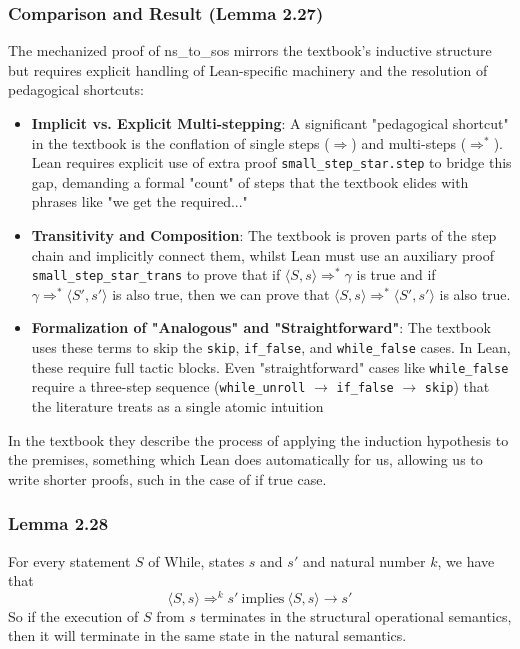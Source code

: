 \subsubsection*{Comparison and Result (Lemma 2.27)}
The mechanized proof of ns\_to\_sos mirrors the textbook's inductive structure
but requires explicit handling of Lean-specific machinery and the resolution
of pedagogical shortcuts:

\begin{itemize}
    \item \textbf{Implicit vs. Explicit Multi-stepping}:
    A significant "pedagogical shortcut" in the textbook is the conflation of
    single steps ($\Rightarrow$) and multi-steps ($\Rightarrow^*$).
    Lean requires explicit use of extra proof \texttt{small\_step\_star.step} to bridge this gap,
    demanding a formal "count" of steps that the textbook elides with phrases
    like "we get the required..."
    
    \item \textbf{Transitivity and Composition}:
    The textbook is proven parts of the step chain and implicitly connect them,
    whilst Lean must use an auxiliary proof\\
    \texttt{small\_step\_star\_trans} to prove that if
    \(\langle S, s \rangle \Rightarrow^* \gamma\) is true and if \(\gamma \Rightarrow^* \langle S', s' \rangle\)
    is also true, then we can prove that \(\langle S, s \rangle \Rightarrow^* \langle S', s' \rangle\)
    is also true.
    
    \item \textbf{Formalization of "Analogous" and "Straightforward"}:
    The textbook uses these terms to skip the \texttt{skip}, \texttt{if\_false}, and
    \texttt{while\_false} cases. In Lean, these require full tactic blocks.
    Even "straightforward" cases like \texttt{while\_false} require a three-step sequence
    (\texttt{while\_unroll} $\to$ \texttt{if\_false} $\to$ \texttt{skip}) that the
    literature treats as a single atomic intuition

\end{itemize}
In the textbook they describe the process of applying the induction hypothesis to the premises,
something which Lean does automatically for us, allowing us to write shorter proofs, such in the case of
if true case.


\subsubsection*{Lemma 2.28}
For every statement \(S\) of While, states \(s\) and \(s'\) and natural number \(k\), we
have that
\[
\langle S, s \rangle \Rightarrow^{k} s'\ \mbox{implies}\ \langle S, s \rangle \to s'
\]
So if the execution of \(S\) from \(s\) terminates in the structural operational semantics,
then it will terminate in the same state in the natural semantics.



